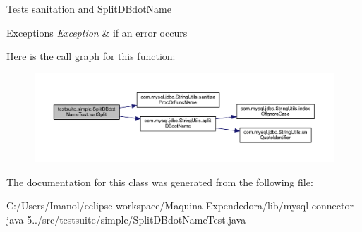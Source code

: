 Tests sanitation and Split\+D\+Bdot\+Name


\begin{DoxyExceptions}{Exceptions}
{\em Exception} & if an error occurs \\
\hline
\end{DoxyExceptions}
Here is the call graph for this function\+:
\nopagebreak
\begin{figure}[H]
\begin{center}
\leavevmode
\includegraphics[width=350pt]{classtestsuite_1_1simple_1_1_split_d_bdot_name_test_a079789e05d1272485f650f92c91777fa_cgraph}
\end{center}
\end{figure}


The documentation for this class was generated from the following file\+:\begin{DoxyCompactItemize}
\item 
C\+:/\+Users/\+Imanol/eclipse-\/workspace/\+Maquina Expendedora/lib/mysql-\/connector-\/java-\/5../src/testsuite/simple/Split\+D\+Bdot\+Name\+Test.\+java\end{DoxyCompactItemize}
